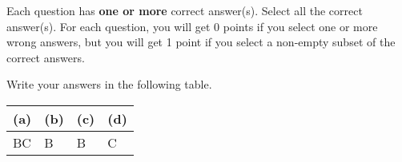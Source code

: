 
Each question has \textbf{one or more} correct answer(s). Select all the correct answer(s). For each question, you will get 0 points if you select one or more wrong answers, but you will get 1 point if you select a non-empty subset of the correct answers.

Write your answers in the following table.


\begin{table}[htbp]
	\centering
	\begin{tabular}{|p{2cm}|p{2cm}|p{2cm}|p{2cm}|}
		\hline
		(a) & (b) & (c) & (d) \\
		\hline
		  BC  &  B   &  B  & C  \\
		\hline
	\end{tabular}
\end{table}

